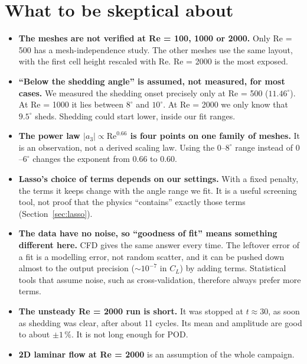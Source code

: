 \documentclass[11pt,a4paper]{article}
\newcommand{\CL}{C_L}
\begin{document}
\section{What to be skeptical about}

\begin{itemize}[leftmargin=*]
\item \textbf{The meshes are not verified at Re = 100, 1000 or 2000.} Only Re = 500 has
  a mesh-independence study. The other meshes use the same layout, with the first cell
  height rescaled with Re. Re = 2000 is the most exposed.

\item \textbf{``Below the shedding angle'' is assumed, not measured, for most cases.}
  We measured the shedding onset precisely only at Re = 500 ($11.46^\circ$). At
  Re = 1000 it lies between $8^\circ$ and $10^\circ$. At Re = 2000 we only know that
  $9.5^\circ$ sheds. Shedding could start lower, inside our fit ranges.

\item \textbf{The power law $|a_3| \propto \mathrm{Re}^{0.66}$ is four points on one
  family of meshes.} It is an observation, not a derived scaling law. Using the
  $0$--$8^\circ$ range instead of $0$--$6^\circ$ changes the exponent from 0.66 to 0.60.

\item \textbf{Lasso's choice of terms depends on our settings.} With a fixed penalty,
  the terms it keeps change with the angle range we fit. It is a useful screening tool,
  not proof that the physics ``contains'' exactly those terms
  (Section~\ref{sec:lasso}).

\item \textbf{The data have no noise, so ``goodness of fit'' means something
  different here.} CFD gives the same answer every time. The leftover error of a fit
  is a modelling error, not random scatter, and it can be pushed down almost to the
  output precision ($\sim 10^{-7}$ in $\CL$) by adding terms. Statistical tools that
  assume noise, such as cross-validation, therefore always prefer more terms.

\item \textbf{The unsteady Re = 2000 run is short.} It was stopped at
  $t \approx 30$, as soon as shedding was clear, after about 11 cycles. Its mean and
  amplitude are good to about $\pm 1\,\%$. It is not long enough for POD.

\item \textbf{2D laminar flow at Re = 2000} is an assumption of the whole campaign.
\end{itemize}
\end{document}
